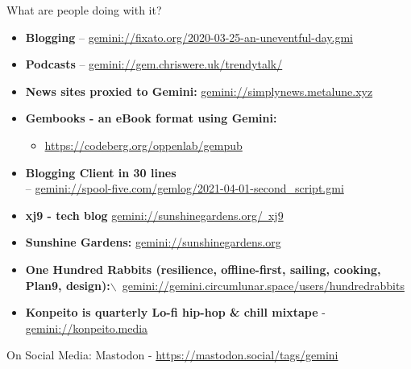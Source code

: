 \documentclass[presentation, 11pt,  aspectratio=169]{beamer}
\renewcommand{\alert}[1]{\textbf{\textcolor{mydarkred}{#1}}}
\begin{document}
\begin{frame}[label={sec:orgc8ec4fe}]{What are people doing with it?}
\begin{itemize}
\item \alert{Blogging} -- \href{gemini://fixato.org/2020-03-25-an-uneventful-day.gmi}{gemini://fixato.org/2020-03-25-an-uneventful-day.gmi}\\
\item \alert{Podcasts} -- \href{gemini://gem.chriswere.uk/trendytalk/}{gemini://gem.chriswere.uk/trendytalk/}\\
\item \alert{News sites proxied to Gemini:} \href{gemini://simplynews.metalune.xyz}{gemini://simplynews.metalune.xyz}\\
\item \alert{Gembooks - an eBook format using Gemini:}\\
\begin{itemize}
\item \url{https://codeberg.org/oppenlab/gempub}\\
\end{itemize}
\item \alert{Blogging Client in 30 lines} \\
-- \href{gemini://spool-five.com/gemlog/2021-04-01-second_script.gmi}{gemini://spool-five.com/gemlog/2021-04-01-second_script.gmi}\\
\item \alert{xj9 - tech blog} \href{gemini://sunshinegardens.org/~xj9}{gemini://sunshinegardens.org/~xj9}\\
\item \alert{Sunshine Gardens:} \href{gemini://sunshinegardens.org}{gemini://sunshinegardens.org}\\
\item \alert{One Hundred Rabbits (resilience, offline-first, sailing, cooking, Plan9, design):}$\backslash$\ \href{gemini://gemini.circumlunar.space/users/hundredrabbits}{gemini://gemini.circumlunar.space/users/hundredrabbits}\\
\item \alert{Konpeito is quarterly Lo-fi hip-hop \& chill mixtape} - \href{gemini://konpeito.media}{gemini://konpeito.media}\\
\end{itemize}

On Social Media: Mastodon - \url{https://mastodon.social/tags/gemini}\\
\end{frame}
\end{document}
